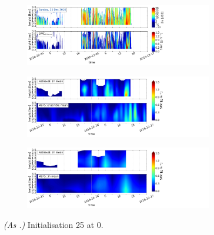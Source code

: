 \begin{figure}[H]%
	\centering
	\begin{subfigure}[t]{1.05\textwidth}
		\centering
		\includegraphics[trim={0.cm 2.2cm 19.cm 0.5cm},clip,width=0.9\textwidth]{./fig_obs_ret/20161225}
		\caption{}\label{fig:SWC:ret_25}
	\end{subfigure}
	\begin{subfigure}[t]{1.05\textwidth}
		\centering
		\includegraphics[trim={0.cm 2.2cm 19.cm 0.5cm},clip,width=0.9\textwidth]{./fig_vert_SWC_EM/20161225}
		\caption{}\label{fig:SWC_EM:25}
	\end{subfigure}
	\begin{subfigure}[t]{1.05\textwidth}
		\centering
		\includegraphics[trim={0.cm 0.8cm 19.cm 0.5cm},clip,width=0.9\textwidth]{./fig_vert_SWC_3h/20161225}
		\caption{}\label{fig:SWC3h:25}
	\end{subfigure}
	\caption{\textit{(As .)} Initialisation \SI{25}{\dec} at \SI{0}{\UTC}.}\label{fig:SWC25}
\end{figure}
